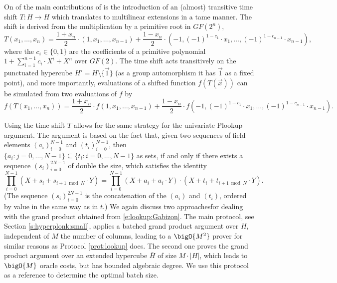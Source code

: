 \documentclass[11pt]{article}
\theoremstyle{definition}
\theoremstyle{definition}
\begin{document}
On of the main contributions of \cite{Hyperplonk} is the introduction of an (almost) transitive time shift $T: H\rightarrow H$ which translates to multilinear extensions in a tame manner.  
The shift is derived from the multiplication by a primitive root in $GF(2^n)$, 
\[
T(x_1, \ldots, x_n) = \frac{1 + x_n}{2} \cdot (1, x_1,\ldots, x_{n-1}) + \frac{1 - x_n }{2} \cdot (- 1,(-1)^{1 - c_1}\cdot x_1,\ldots, (-1)^{1 - c_{n - 1}}\cdot x_{n-1}),
\]  
where the $c_i\in\{0,1\}$ are the coefficients of a primitive polynomial $1 + \sum_{i=1}^{n-1} c_i\cdot X^i + X^n$ over $GF(2)$.
The time shift acts transitively on the punctuated hypercube $H' = H\setminus\{\vec 1\}$ (as a group automorphism it has $\vec 1$ as a fixed point), and more importantly, evaluations of a shifted function $f(T(\vec x))$ can be simulated from two evaluations of $f$ by
\begin{equation}
\label{e:hyperplonk:shifted:function}
f(T(x_1, \ldots, x_n)) =  \frac{1 + x_n}{2} \cdot f(1, x_1,\ldots, x_{n-1}) + \frac{1 - x_n }{2} \cdot f(- 1,(-1)^{1 - c_1}\cdot x_1,\ldots, (-1)^{1 - c_{n - 1}}\cdot x_{n-1}).
\end{equation}

Using the time shift $T$ allows for the same strategy for the univariate Plookup argument. 
The argument is based on the fact that, given two sequences of field elements $(a_i)_{i=0}^{N-1}$ and $(t_i)_{i=0}^{N-1}$, then $\{a_i : j= 0,\ldots, N-1\}\subseteq \{t_i : i = 0, \ldots, N-1\}$ as sets, if and only if there exists a sequence $(s_i)_{i=0}^{2N-1}$ of double the size, which satisfies the identity
\begin{equation}
\label{e:lookup:Gabizon}
\prod_{i=0}^{N-1} (X + s_{i}+ s_{i+1\bmod N}\cdot Y)
= \prod_{i=0}^{N-1}  (X + a_i + a_i\cdot Y)\cdot (X + t_i + t_{i+1\bmod N}\cdot Y).
\end{equation}
(The sequence $(s_i)_{i=0}^{2N-1}$ is  the concatenation of the $(a_i)$ and $(t_i)$, ordered by value in the same way as in $t$.)
We again discuss two approaches\footnotemark for dealing with the grand product obtained from \eqref{e:lookup:Gabizon}.%
The main protocol, see Section \ref{s:hyperplonk:small}, applies a batched grand product argument over $H$, independent of $M$ the number of columns, leading to a $\bigO{M^2}$ prover for similar reasons as Protocol \ref{prot:lookup} does.
The second one proves the grand product argument over an extended hypercube $\bar H$ of size $M\cdot |H|$, which leads to $\bigO{M}$ oracle costs, but has bounded algebraic degree.
We use this protocol as a reference to determine the optimal batch size.
\end{document}
